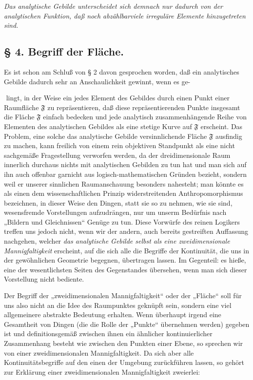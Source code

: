 \documentclass{article}
\begin{document}
\emph{Das analytische Gebilde unterscheidet sich demnach nur dadurch von der analytischen Funktion, daß noch abzählbarviele irreguläre Elemente hinzugetreten sind.}

\subsection*{§ 4. Begriff der Fläche.}

Es ist schon am Schluß von § 2 davon gesprochen worden, daß ein analytisches Gebilde dadurch sehr an Anschaulichkeit gewinnt, wenn es ge-

﻿
lingt, in der Weise ein jedes Element des Gebildes durch einen Punkt einer Raumfläche $\mathfrak{F}$ zu repräsentieren, daß diese repräsentierenden Punkte insgesamt die Fläche $\mathfrak{F}$ einfach bedecken und jede analytisch zusammenhängende Reihe von Elementen des analytischen Gebildes als eine stetige Kurve auf $\mathfrak{F}$ erscheint. Das Problem, eine solche das analytische Gebilde versinnlichende Fläche $\mathfrak{F}$ ausfindig zu machen, kann freilich von einem rein objektiven Standpunkt als eine nicht sachgemäße Fragestellung verworfen werden, da der dreidimensionale Raum innerlich durchaus nichts mit analytischen Gebilden zu tun hat und man sich auf ihn auch offenbar garnicht aus logisch-mathematischen Gründen bezieht, sondern weil er unserer sinnlichen Raumanschauung besonders nahesteht; man könnte es als einen dem wissenschaftlichen Prinzip widerstreitenden Anthropomorphismus bezeichnen, in dieser Weise den Dingen, statt sie so zu nehmen, wie sie sind, wesensfremde Vorstellungen aufzudrängen, nur um unserm Bedürfnis nach „Bildern und Gleichnissen“ Genüge zu tun. Diese Vorwürfe des reinen Logikers treffen uns jedoch nicht, wenn wir der andern, auch bereits gestreiften Auffassung nachgehen, welcher \emph{das analytische Gebilde selbst als eine zweidimensionale Mannigfaltigkeit} erscheint, auf die sich alle die Begriffe der Kontinuität, die uns in der gewöhnlichen Geometrie begegnen, übertragen lassen. Im Gegenteil: es hieße, eine der wesentlichsten Seiten des Gegenstandes übersehen, wenn man sich dieser Vorstellung nicht bediente.

Der Begriff der „zweidimensionalen Mannigfaltigkeit“ oder der „Fläche“ soll für uns also nicht an die Idee des Raumpunktes geknüpft sein, sondern eine viel allgemeinere abstrakte Bedeutung erhalten. Wenn überhaupt irgend eine Gesamtheit von Dingen (die die Rolle der „Punkte“ übernehmen werden) gegeben ist und definitionsgemäß zwischen ihnen ein ähnlicher kontinuierlicher Zusammenhang besteht wie zwischen den Punkten einer Ebene, so sprechen wir von einer zweidimensionalen Mannigfaltigkeit. Da sich aber alle Kontinuitätsbegriffe auf den einen der Umgebung zurückführen lassen, so gehört zur Erklärung einer zweidimensionalen Mannigfaltigkeit zweierlei:
\end{document}
